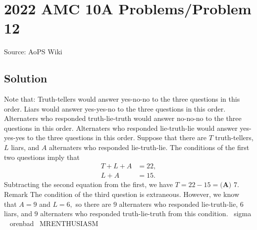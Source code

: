 \documentclass[12pt]{article}
\begin{document}
\section*{{2022 AMC 10A Problems/Problem 12}}
Source: AoPS Wiki

\subsection*{Solution}
Note that: Truth-tellers would answer yes-no-no to the three questions in this order. Liars would answer yes-yes-no to the three questions in this order. Alternaters who responded truth-lie-truth would answer no-no-no to the three questions in this order. Alternaters who responded lie-truth-lie would answer yes-yes-yes to the three questions in this order. Suppose that there are $T$ truth-tellers, $L$ liars, and $A$ alternaters who responded lie-truth-lie. The conditions of the first two questions imply that \begin{align*} T+L+A&=22, \\ L+A&=15. \end{align*} Subtracting the second equation from the first, we have $T=22-15=\boxed{\textbf{(A) } 7}.$ Remark The condition of the third question is extraneous. However, we know that $A=9$ and $L=6,$ so there are $9$ alternaters who responded lie-truth-lie, $6$ liars, and $9$ alternaters who responded truth-lie-truth from this condition. ~sigma ~ orenbad ~MRENTHUSIASM
\end{document}

